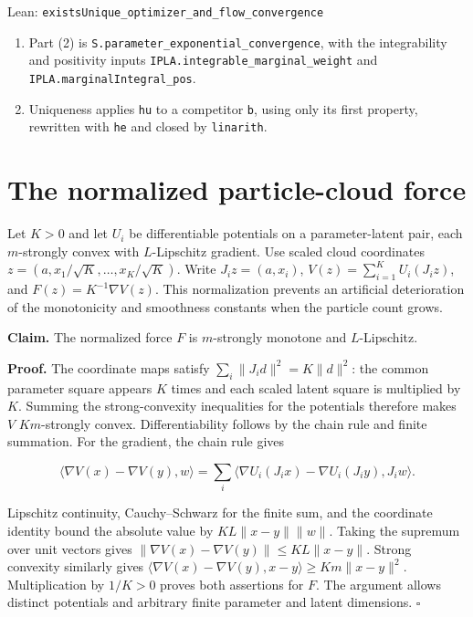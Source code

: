 \documentclass[11pt,a4paper]{report}
\begin{document}
\begin{leanbox}{Lean: \texttt{existsUnique\_\allowbreak{}optimizer\_\allowbreak{}and\_\allowbreak{}flow\_\allowbreak{}convergence}}
\begin{enumerate}
\item Part (2) is \texttt{S.\allowbreak{}parameter\_\allowbreak{}exponential\_\allowbreak{}convergence}, with the integrability and positivity inputs \texttt{IPLA.\allowbreak{}integrable\_\allowbreak{}marginal\_\allowbreak{}weight} and \texttt{IPLA.\allowbreak{}marginal\allowbreak{}Integral\_\allowbreak{}pos}.

\item Uniqueness applies \texttt{hu} to a competitor \texttt{b}, using only its first property, rewritten with \texttt{he} and closed by \texttt{linarith}.

\end{enumerate}
\end{leanbox}
\section{\texorpdfstring{The normalized particle-cloud force}{The normalized particle-cloud force}}


Let \(K>0\) and let \(U_i\) be differentiable potentials on a parameter-latent pair, each \(m\)-strongly convex with \(L\)-Lipschitz gradient. Use scaled cloud coordinates \(z=(a,x_1/\sqrt K,\ldots,x_K/\sqrt K)\). Write \(J_i z=(a,x_i)\), \(V(z)=\sum_{i=1}^KU_i(J_i z)\), and \(F(z)=K^{-1}\nabla V(z)\). This normalization prevents an artificial deterioration of the monotonicity and smoothness constants when the particle count grows.



\textbf{Claim.} The normalized force \(F\) is \(m\)-strongly monotone and \(L\)-Lipschitz.



\textbf{Proof.} The coordinate maps satisfy \(\sum_i\|J_i d\|^2=K\|d\|^2\): the common parameter square appears \(K\) times and each scaled latent square is multiplied by \(K\). Summing the strong-convexity inequalities for the potentials therefore makes \(V\) \(Km\)-strongly convex. Differentiability follows by the chain rule and finite summation. For the gradient, the chain rule gives

\[\langle\nabla V(x)-\nabla V(y),w\rangle=\sum_i\langle\nabla U_i(J_ix)-\nabla U_i(J_iy),J_iw\rangle.\]

Lipschitz continuity, Cauchy–Schwarz for the finite sum, and the coordinate identity bound the absolute value by \(KL\|x-y\|\|w\|\). Taking the supremum over unit vectors gives \(\|\nabla V(x)-\nabla V(y)\|\le KL\|x-y\|\). Strong convexity similarly gives \(\langle\nabla V(x)-\nabla V(y),x-y\rangle\ge Km\|x-y\|^2\). Multiplication by \(1/K>0\) proves both assertions for \(F\). The argument allows distinct potentials and arbitrary finite parameter and latent dimensions. \(\square\)
\end{document}
